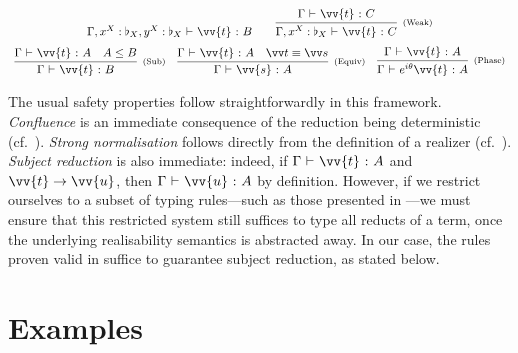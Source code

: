 \documentclass[runningheads,orivec,envcountsame,envcountsect]{llncs}
\providecommand{\qed}{\hbox{\rule{1ex}{1ex}}}%
\def\SUB#1#2{#1\le#2}
\def\TYP#1#2#3{#1~{\vdash}~#2~{:}~#3}
\def\snam#1{\textsc{\scriptsize\upshape(#1)}}
\newcommand\basis[1]{\ensuremath{\flat_{#1}}}
\begin{document}
\begin{table}[t]
\[\begin{array}{c}
{	\TYP{\Gamma,x^{X}:{\basis{X}},y^{X}:{\basis{X}}}{\vv{t}}{B}
      } 
      \qquad
	\infer[\snam{Weak}]{\TYP{\Gamma,x^{X}:\basis{X}}{\vv{t}}{C}}{
	  \TYP{\Gamma}{\vv{t}}{C}
	}
      \\
      \noalign{\medskip}
      \infer[\snam{Sub}]{\TYP{\Gamma}{\vv{t}}{B}}{\TYP{\Gamma}{\vv{t}}{A} & \SUB{A}{B}}
      \quad
      \infer[\snam{Equiv}]{\TYP{\Gamma}{\vv{s}}{A}}{
	\TYP{\Gamma}{\vv{t}}{A}& \vv t\equiv \vv s
      }
      \quad 
      \infer[\snam{Phase}]{\TYP{\Gamma}{e^{i\theta}\vv{t}}{A}}
      {\TYP{\Gamma}{\vv{t}}{A}}
    \end{array}
  \]
  \caption{Some valid typing rules}
  \label{tab:TypingRules}
\end{table}



The usual safety properties follow straightforwardly in this framework.
\emph{Confluence} is an immediate consequence of the reduction being
deterministic (cf.~).  
\emph{Strong normalisation} follows directly from the definition of a
realizer (cf.~).  
\emph{Subject reduction} is also immediate: indeed, if
$\TYP{\Gamma}{\vv{t}}{A}$ and $\vv{t}\to\vv{u}$, then
$\TYP{\Gamma}{\vv{u}}{A}$ by definition.
However, if we restrict ourselves to a subset of typing rules—such as those
presented in —we must
ensure that this restricted system still suffices to type all reducts of a
term, once the underlying realisability semantics is abstracted away.  In our
case, the rules proven valid in 
suffice to guarantee subject reduction, as
stated below.



\section{Examples}\label{sec:examples}
\end{document}

